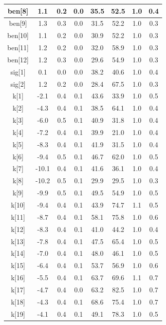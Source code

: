 \begin{longtable}{|c|c|c|c|c|c|c|c|}
\hline
ben[8] & 1.1 & 0.2 & 0.0 & 35.5 & 52.5 & 1.0 & 0.4 \\
\hline
ben[9] & 1.3 & 0.3 & 0.0 & 31.5 & 52.2 & 1.0 & 0.3 \\
\hline
ben[10] & 1.1 & 0.2 & 0.0 & 30.9 & 52.2 & 1.0 & 0.3 \\
\hline
ben[11] & 1.2 & 0.2 & 0.0 & 32.0 & 58.9 & 1.0 & 0.3 \\
\hline
ben[12] & 1.2 & 0.3 & 0.0 & 29.6 & 54.9 & 1.0 & 0.3 \\
\hline
sig[1] & 0.1 & 0.0 & 0.0 & 38.2 & 40.6 & 1.0 & 0.4 \\
\hline
sig[2] & 1.2 & 0.2 & 0.0 & 28.4 & 67.5 & 1.0 & 0.3 \\
\hline
k[1] & -2.1 & 0.4 & 0.1 & 43.6 & 33.9 & 1.0 & 0.5 \\
\hline
k[2] & -4.3 & 0.4 & 0.1 & 38.5 & 64.1 & 1.0 & 0.4 \\
\hline
k[3] & -6.0 & 0.5 & 0.1 & 40.9 & 31.8 & 1.0 & 0.4 \\
\hline
k[4] & -7.2 & 0.4 & 0.1 & 39.9 & 21.0 & 1.0 & 0.4 \\
\hline
k[5] & -8.3 & 0.4 & 0.1 & 41.9 & 31.5 & 1.0 & 0.4 \\
\hline
k[6] & -9.4 & 0.5 & 0.1 & 46.7 & 62.0 & 1.0 & 0.5 \\
\hline
k[7] & -10.1 & 0.4 & 0.1 & 41.6 & 36.1 & 1.0 & 0.4 \\
\hline
k[8] & -10.2 & 0.5 & 0.1 & 29.9 & 29.5 & 1.0 & 0.3 \\
\hline
k[9] & -9.9 & 0.5 & 0.1 & 49.5 & 54.9 & 1.0 & 0.5 \\
\hline
k[10] & -9.4 & 0.4 & 0.1 & 43.9 & 74.7 & 1.1 & 0.5 \\
\hline
k[11] & -8.7 & 0.4 & 0.1 & 58.1 & 75.8 & 1.0 & 0.6 \\
\hline
k[12] & -8.3 & 0.4 & 0.1 & 41.0 & 44.2 & 1.0 & 0.4 \\
\hline
k[13] & -7.8 & 0.4 & 0.1 & 47.5 & 65.4 & 1.0 & 0.5 \\
\hline
k[14] & -7.0 & 0.4 & 0.1 & 48.0 & 46.1 & 1.0 & 0.5 \\
\hline
k[15] & -6.4 & 0.4 & 0.1 & 53.7 & 56.9 & 1.0 & 0.6 \\
\hline
k[16] & -5.5 & 0.4 & 0.1 & 63.7 & 69.6 & 1.1 & 0.7 \\
\hline
k[17] & -4.7 & 0.4 & 0.0 & 63.2 & 82.5 & 1.0 & 0.7 \\
\hline
k[18] & -4.3 & 0.4 & 0.1 & 68.6 & 75.4 & 1.0 & 0.7 \\
\hline
k[19] & -4.1 & 0.4 & 0.1 & 49.1 & 78.3 & 1.0 & 0.5 \\

\end{longtable}
